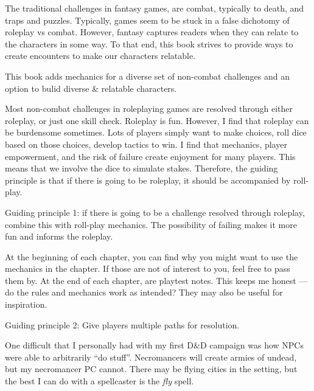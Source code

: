 \documentclass[twocolumn]{dndbook}
\begin{document}
The traditional challenges in fantasy games, are combat, typically to death, and traps and puzzles.
Typically, games seem to be stuck in a false dichotomy of roleplay vs combat.
However, fantasy captures readers when they can relate to the characters in some way.
To that end, this book strives to provide ways to create encounters to make our characters relatable.\par

\begin{emphasisParagraph}
This book adds mechanics for a diverse set of non-combat challenges and an option to bulid diverse \& relatable characters.
\end{emphasisParagraph}

Most non-combat challenges in roleplaying games are resolved through either roleplay, or just one skill check.
Roleplay is fun. However, I find that roleplay can be burdensome sometimes.
Lots of players simply want to make choices, roll dice based on those choices, develop tactics to win.
I find that mechanics, player empowerment, and the risk of failure create enjoyment for many players.
This means that we involve the dice to simulate stakes.
Therefore, the guiding principle is that if there is going to be roleplay, it should be accompanied by roll-play.\par

\begin{emphasisParagraph}
	Guiding principle 1: if there is going to be a challenge resolved through roleplay, combine this with roll-play mechanics.
	The possibility of failing makes it more fun and informs the roleplay.
\end{emphasisParagraph}

At the beginning of each chapter, you can find why you might want to use the mechanics in the chapter.
If those are not of interest to you, feel free to pass them by.
At the end of each chapter, are playtest notes.
This keeps me honest --- do the rules and mechanics work as intended?
They may also be useful for inspiration.\par

\begin{emphasisParagraph}
	Guiding principle 2: Give players multiple paths for resolution.
\end{emphasisParagraph}

One difficult that I personally had with my first D\&D campaign was how NPCs were able to arbitrarily ``do stuff''.
Necromancers will create armies of undead, but my necromancer PC cannot.
There may be flying cities in the setting, but the best I can do with a spellcaster is the \emph{fly} spell.
\end{document}
